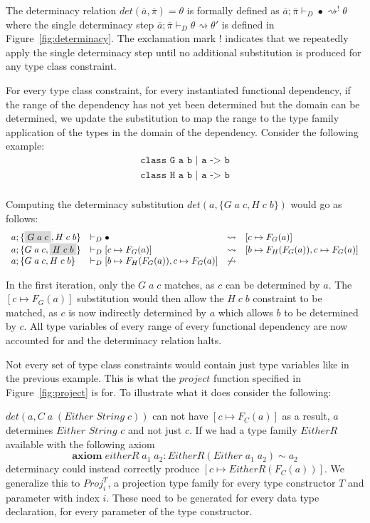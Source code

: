 The determinacy relation $det(\overline{a},\overline{\pi}) = \theta$ is formally
defined as $\overline{a};\overline{\pi} \vdash_{D} \bullet \rightsquigarrow^!
\theta$ where the single determinacy step $\overline{a};\overline{\pi}
\vdash_{D} \theta \rightsquigarrow \theta'$ is defined in
Figure~\ref{fig:determinacy}. The exclamation mark $!$ indicates that we
repeatedly apply the single determinacy step until no additional substitution is
produced for any type class constraint.

For every type class constraint, for every instantiated functional dependency,
if the range of the dependency has not yet been determined but the domain can be
determined, we update the substitution to map the range to the type family
application of the types in the domain of the dependency. Consider the following
example:
\[
\begin{array}{l}
\texttt{class G a b | a -> b}\\
\texttt{class H a b | a -> b}\\
\end{array}
\]

Computing the determinacy substitution $det(a, \{G \; a \; c, H \; c \; b \} )$
would go as follows:
\[
\begin{array}{l l c l}
a; \{\highlight{G \; a \; c}, H \; c \; b\} &\vdash_{D} \bullet
&\rightsquigarrow& [c \mapsto F_G(a)]
\\
a; \{G \; a \; c, \highlight{H \; c \; b}\} &\vdash_{D}  [c \mapsto F_G(a)]
&\rightsquigarrow& [b \mapsto F_H(F_G(a)), c \mapsto F_G(a)]
\\
a; \{G \; a \; c, H \; c \; b\} &\vdash_{D}  [b \mapsto F_H(F_G(a)), c \mapsto
F_G(a)] &\not\rightsquigarrow&
\end{array}
\]

In the first iteration, only the $G \; a \; c$ matches, as $c$ can be determined
by $a$. The $[c \mapsto F_G(a)]$ substitution would then allow the $H \; c \; b$
constraint to be matched, as $c$ is now indirectly determined by $a$ which
allows $b$ to be determined by $c$. All type variables of every range of every
functional dependency are now accounted for and the determinacy relation halts.

Not every set of type class constraints would contain just type variables like
in the previous example. This is what the $project$ function specified in
Figure~\ref{fig:project} is for. To illustrate what it does consider the
following:

$det(a, C \; a \; (Either \;
String \; c))$ can not have $[c \mapsto F_C(a)]$ as a result, $a$ determines
$Either$ $String$ $c$ and not just $c$. If we had a type family $EitherR$
available with the following axiom
\[
  \textbf{axiom} \; eitherR \; a_1 \; a_2 : EitherR(Either \; a_1 \; a_2) \sim a_2
\]
determinacy could instead correctly produce $[c \mapsto EitherR(F_C(a))]$. We
generalize this to $Proj^T_i$, a projection type family for every type
constructor $T$ and parameter with index $i$. These need to be generated for
every data type declaration, for every parameter of the type constructor.

